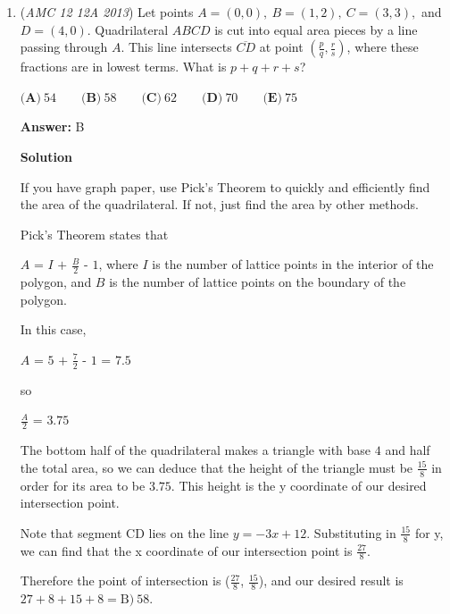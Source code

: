 \begin{enumerate}
 Thus our answer is $2+\sqrt{13}+sqrt{21}=a+\sqrt{b}+\sqrt{c}$ which means $a=2, b=13, c=21$. So, $a+b+c$ equals $2+13+21=36$ which is answer choice A. 

 (NOTE: Problem 12 starts at 8:50 in the youtube video  ~jyang66)

 


	\item (\textit{AMC 12 12A 2013}) Let points $A = (0,0) , \ B = (1,2), \ C = (3,3),$ and $D = (4,0)$. Quadrilateral $ABCD$ is cut into equal area pieces by a line passing through $A$. This line intersects $\overline{CD}$ at point $\left (\frac{p}{q}, \frac{r}{s} \right )$, where these fractions are in lowest terms. What is $p + q + r + s$?


 $\textbf{(A)} \ 54 \qquad \textbf{(B)} \ 58 \qquad  \textbf{(C)} \ 62 \qquad \textbf{(D)} \ 70 \qquad \textbf{(E)} \ 75$

 \textbf{Answer: }B



\textbf{Solution}

If you have graph paper, use Pick's Theorem to quickly and efficiently find the area of the quadrilateral. If not, just find the area by other methods.

 Pick's Theorem states that

 $A$ = $I$ $+$ $\frac{B}{2}$ - $1$, where $I$ is the number of lattice points in the interior of the polygon, and $B$ is the number of lattice points on the boundary of the polygon.

 In this case, 

 $A$ = $5$ $+$ $\frac{7}{2}$ - $1$ = $7.5$

 so

 $\frac{A}{2}$ = $3.75$

 The bottom half of the quadrilateral makes a triangle with base $4$ and half the total area, so we can deduce that the height of the triangle must be $\frac{15}{8}$ in order for its area to be $3.75$. This height is the y coordinate of our desired intersection point.

 
Note that segment CD lies on the line $y = -3x + 12$. Substituting in $\frac{15}{8}$ for y, we can find that the x coordinate of our intersection point is $\frac{27}{8}$.

 Therefore the point of intersection is ($\frac{27}{8}$, $\frac{15}{8}$), and our desired result is $27+8+15+8= \boxed{ \text{B}) \ 58}$.

 




\end{enumerate}
